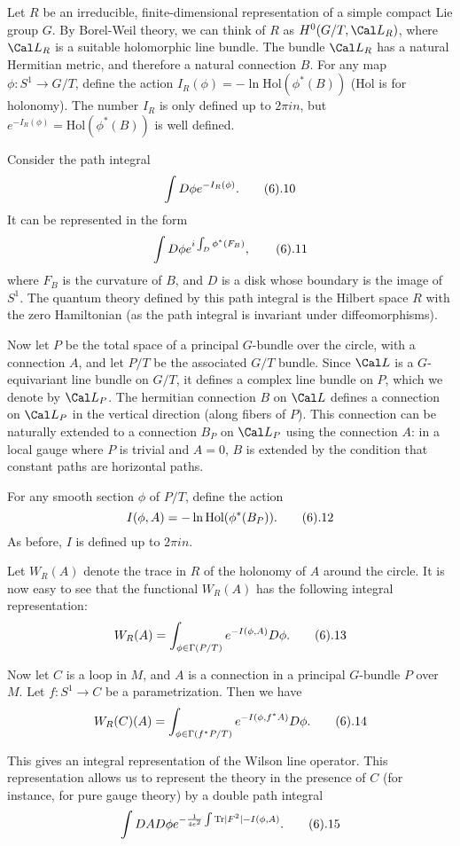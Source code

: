 Let $R$ be an irreducible, finite-dimensional representation of a  
simple compact Lie group $G$. By Borel-Weil theory, we can think of $R$ 
as $H^0(G/T,\Cal L_R)$, where $\Cal L_R$ is a suitable holomorphic 
line bundle. The bundle $\Cal L_R$ has a natural Hermitian metric, 
and therefore a natural connection $B$. For any map $\phi: S^1\to G/T$, 
define the action $I_R(\phi)=-\ln \text{Hol}(\phi^*(B))$ (Hol is for holonomy).
The number $I_R$ is only defined up to $2\pi in$, but 
$e^{-I_R(\phi)}=\text{Hol}(\phi^*(B))$ is well defined. 

Consider the path integral
$$
\int D\phi e^{-I_R(\phi)}.\tag 6.10
$$
It can be represented in the form
$$
\int D\phi e^{i\int_D \phi^*(F_B)},\tag 6.11
$$
where $F_B$ is the curvature of $B$, and $D$ is a disk whose boundary
is the image of $S^1$. 
The quantum theory defined by this path integral is the Hilbert space $R$ 
with the zero Hamiltonian (as the path integral is invariant under 
diffeomorphisms). 

Now let $P$ be the total space of 
a principal $G$-bundle over the circle, 
with a connection $A$, and let $P/T$ be the 
associated $G/T$ bundle. Since $\Cal L$ is a $G$-equivariant line bundle 
on $G/T$, it defines a complex line bundle on $P$, which we denote by 
$\Cal L_P$. The hermitian connection $B$ on $\Cal L$ defines a 
connection on $\Cal L_P$ in the vertical direction (along fibers of $P$). 
This connection can be naturally extended to a connection $B_P$ on $\Cal L_P$ 
using the connection $A$: in a local gauge where $P$ is trivial and $A=0$, 
$B$ is extended by the condition that constant paths   
are horizontal paths.

For any smooth section $\phi$ of $P/T$, define the action
$$
I(\phi,A)=-\ln \text{Hol}(\phi^*(B_P)).\tag 6.12
$$
As before, $I$ is defined up to $2\pi i n$. 

Let $W_R(A)$ denote the trace in $R$ of the holonomy of $A$ around 
the circle. 
It is now easy to see that the functional $W_R(A)$ has the following 
integral representation: 
$$
W_R(A)=\int_{\phi\in \Gamma(P/T)}e^{-I(\phi,A)}D\phi.\tag 6.13
$$

Now let $C$ is a loop in $M$, and $A$ is a connection in a principal 
$G$-bundle $P$ over $M$. Let $f: S^1\to C$ be a parametrization.
Then we have
$$
W_R(C)(A)=\int_{\phi\in \Gamma(f^*P/T)}e^{-I(\phi,f^*A)}D\phi.\tag 6.14
$$

This gives an integral representation of the Wilson line operator.
This representation allows us to represent the theory in the presence of $C$
(for instance, for pure gauge theory) by a double path integral
$$
\int DAD\phi e^{-\frac{1}{4e^2}\int \Tr |F^2|-I(\phi,A)}.\tag 6.15
$$

